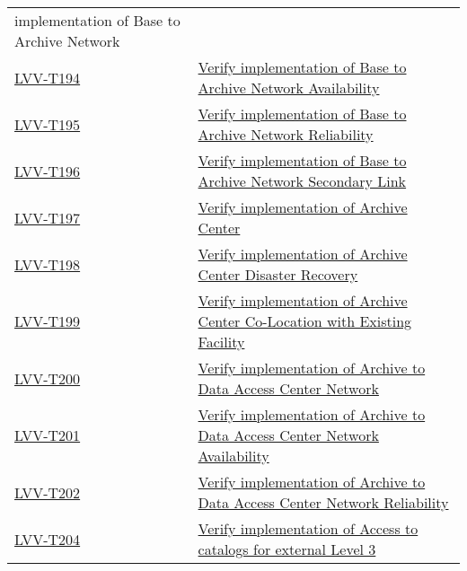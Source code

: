 \begin{longtable}[]{p{3cm}p{13cm}}
{implementation of Base to Archive Network}\tabularnewline
\protect\hyperlink{lvv-t194---verify-implementation-of-base-to-archive-network-availability}{LVV-T194}
&
\href{https://jira.lsstcorp.org/secure/Tests.jspa\#/testCase/LVV-T194}{Verify
implementation of Base to Archive Network Availability}\tabularnewline
\protect\hyperlink{lvv-t195---verify-implementation-of-base-to-archive-network-reliability}{LVV-T195}
&
\href{https://jira.lsstcorp.org/secure/Tests.jspa\#/testCase/LVV-T195}{Verify
implementation of Base to Archive Network Reliability}\tabularnewline
\protect\hyperlink{lvv-t196---verify-implementation-of-base-to-archive-network-secondary-link}{LVV-T196}
&
\href{https://jira.lsstcorp.org/secure/Tests.jspa\#/testCase/LVV-T196}{Verify
implementation of Base to Archive Network Secondary Link}\tabularnewline
\protect\hyperlink{lvv-t197---verify-implementation-of-archive-center}{LVV-T197}
&
\href{https://jira.lsstcorp.org/secure/Tests.jspa\#/testCase/LVV-T197}{Verify
implementation of Archive Center}\tabularnewline
\protect\hyperlink{lvv-t198---verify-implementation-of--archive-center-disaster-recovery}{LVV-T198}
&
\href{https://jira.lsstcorp.org/secure/Tests.jspa\#/testCase/LVV-T198}{Verify
implementation of Archive Center Disaster Recovery}\tabularnewline
\protect\hyperlink{lvv-t199---verify-implementation-of-archive-center-co-location-with-existing-facility}{LVV-T199}
&
\href{https://jira.lsstcorp.org/secure/Tests.jspa\#/testCase/LVV-T199}{Verify
implementation of Archive Center Co-Location with Existing
Facility}\tabularnewline
\protect\hyperlink{lvv-t200---verify-implementation-of-archive-to-data-access-center-network}{LVV-T200}
&
\href{https://jira.lsstcorp.org/secure/Tests.jspa\#/testCase/LVV-T200}{Verify
implementation of Archive to Data Access Center Network}\tabularnewline
\protect\hyperlink{lvv-t201---verify-implementation-of-archive-to-data-access-center-network-availability}{LVV-T201}
&
\href{https://jira.lsstcorp.org/secure/Tests.jspa\#/testCase/LVV-T201}{Verify
implementation of Archive to Data Access Center Network
Availability}\tabularnewline
\protect\hyperlink{lvv-t202---verify-implementation-of-archive-to-data-access-center-network-reliability}{LVV-T202}
&
\href{https://jira.lsstcorp.org/secure/Tests.jspa\#/testCase/LVV-T202}{Verify
implementation of Archive to Data Access Center Network
Reliability}\tabularnewline
\protect\hyperlink{lvv-t204---verify-implementation-of-access-to-catalogs-for-external-level-3-processing}{LVV-T204}
&
\href{https://jira.lsstcorp.org/secure/Tests.jspa\#/testCase/LVV-T204}{Verify
implementation of Access to catalogs for external Level 3
}
\end{longtable}
